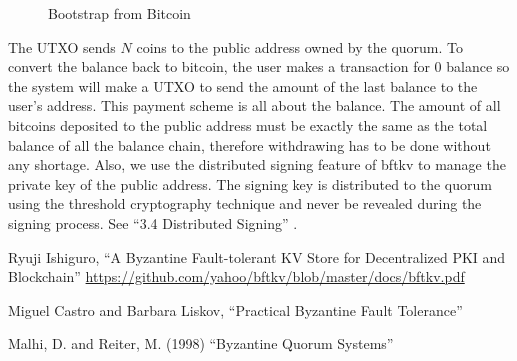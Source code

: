 \documentclass[10pt,fleqn]{article}
\begin{document}
\begin{figure}[H]
\begin{center}
\end{center}
\caption{Bootstrap from Bitcoin}
\end{figure}

The UTXO sends $N$ coins to the public address owned by the quorum. To convert the balance back to bitcoin, the user makes a transaction for $0$ balance so the system will make a UTXO to send the amount of the last balance to the user's address.
This payment scheme is all about the balance. The amount of all bitcoins deposited to the public address must be exactly the same as the total balance of all the balance chain, therefore withdrawing has to be done without any shortage.
Also, we use the distributed signing feature of {\sf bftkv} to manage the private key of the public address. The signing key is distributed to the quorum using the threshold cryptography technique and never be revealed during the signing process. See ``3.4 Distributed Signing'' \cite{bftkv}.

\begin{thebibliography}{99}

  Ryuji Ishiguro, ``A Byzantine Fault-tolerant KV Store for Decentralized PKI and Blockchain'' \url{https://github.com/yahoo/bftkv/blob/master/docs/bftkv.pdf}

  Miguel Castro and Barbara Liskov, ``Practical Byzantine Fault Tolerance''

  Malhi, D. and Reiter, M. (1998) ``Byzantine Quorum Systems''

\end{thebibliography}
\end{document}
